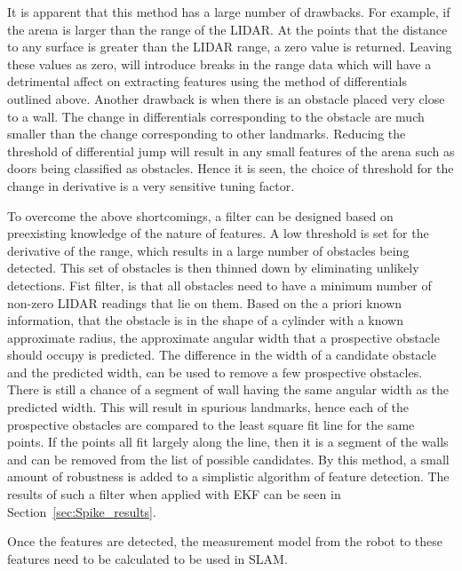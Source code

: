 It is apparent that this method has a large number of drawbacks. For example, if the arena is larger than the range of the LIDAR. At the points that the distance to any surface is greater than the LIDAR range, a zero value is returned. Leaving these values as zero, will introduce breaks in the range data which will have a detrimental affect on extracting features using the method of differentials outlined above. Another drawback is when there is an obstacle placed very close to a wall. The change in differentials corresponding to the obstacle are much smaller than the change corresponding to other landmarks. Reducing the threshold of differential jump will result in any small features of the arena such as doors being classified as obstacles. Hence it is seen, the choice of threshold for the change in derivative is a very sensitive tuning factor. 

To overcome the above shortcomings, a filter can be designed based on preexisting knowledge of the nature of features. A low threshold is set for the derivative of the range, which results in a large number of obstacles being detected. This set of obstacles is then thinned down by eliminating unlikely detections. Fist filter, is that all obstacles need to have a minimum number of non-zero LIDAR readings that lie on them. Based on the a priori known information, that the obstacle is in the shape of a cylinder with a known approximate radius, the approximate angular width that a prospective obstacle should occupy is predicted. The difference in the width of a candidate obstacle and the predicted width, can be used to remove a few prospective obstacles. There is still a chance of a segment of wall having the same angular width as the predicted width. This will result in spurious landmarks, hence each of the prospective obstacles are compared to the least square fit line for the same points. If the points all fit largely along the line, then it is a segment of the walls and can be removed from the list of possible candidates. By this method, a small amount of robustness is added to a simplistic algorithm of feature detection. The results of such a filter when applied with EKF can be seen in Section~\ref{sec:Spike_results}.

Once the features are detected, the measurement model from the robot to these features need to be calculated to be used in \ekf SLAM.

